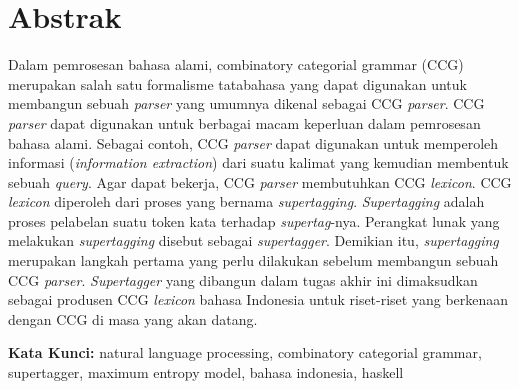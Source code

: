 \chapter*{Abstrak}

Dalam pemrosesan bahasa alami, combinatory categorial grammar (CCG) merupakan salah satu
formalisme tatabahasa yang dapat digunakan untuk membangun sebuah \textit{parser} yang umumnya
dikenal sebagai CCG \textit{parser}.
CCG \textit{parser} dapat digunakan untuk berbagai macam keperluan dalam pemrosesan bahasa alami.
Sebagai contoh, CCG \textit{parser} dapat digunakan untuk memperoleh informasi
(\textit{information extraction}) dari suatu kalimat yang kemudian membentuk sebuah \textit{query}.
Agar dapat bekerja, CCG \textit{parser} membutuhkan CCG \textit{lexicon}.
CCG \textit{lexicon} diperoleh dari proses yang bernama \textit{supertagging}.
\textit{Supertagging} adalah proses pelabelan suatu token kata terhadap \textit{supertag}-nya.
Perangkat lunak yang melakukan \textit{supertagging} disebut sebagai \textit{supertagger}.
Demikian itu, \textit{supertagging} merupakan langkah pertama yang perlu dilakukan sebelum
membangun sebuah CCG \textit{parser}.
\textit{Supertagger} yang dibangun dalam tugas akhir ini dimaksudkan sebagai produsen CCG
\textit{lexicon} bahasa Indonesia untuk riset-riset yang berkenaan dengan CCG di masa yang akan datang.


\vspace{0.5 cm}
\begin{flushleft}
{\textbf{Kata Kunci:}
  natural language processing, combinatory categorial grammar, supertagger,
  maximum entropy model, bahasa indonesia, haskell
}
\end{flushleft}
